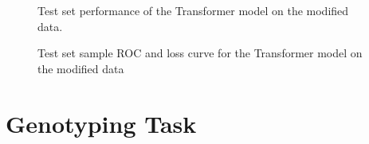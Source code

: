 \documentclass[bsc,frontabs,singlespacing,parskip,deptreport]{infthesis}
\begin{document}
\begin{figure}
\begin{center}
\setlength{\belowcaptionskip}{0pt}
\caption{Test set performance of the Transformer model on the modified data.}
\end{center}
\end{figure}

\begin{figure}
\begin{center}
\setlength{\belowcaptionskip}{0pt}
\caption{Test set sample ROC and loss curve for the Transformer model on the modified data}
\end{center}
\end{figure}

\section{Genotyping Task}
\end{document}

